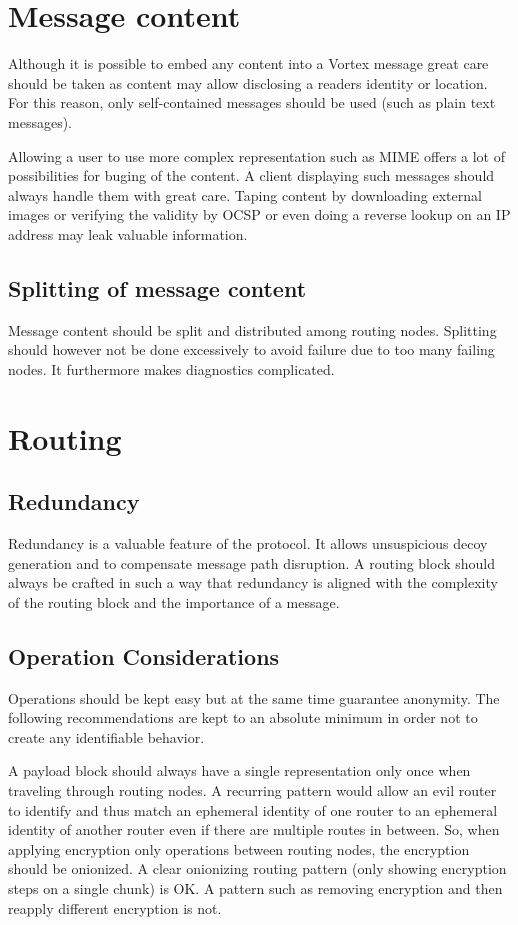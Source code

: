 \section{Message content}
Although it is possible to embed any content into a Vortex message great care should be taken as content may allow disclosing a readers identity or location. For this reason, only self-contained messages should be used (such as plain text messages).

Allowing a user to use more complex representation such as MIME offers a lot of possibilities for buging of the content. A client displaying such messages should always handle them with great care. Taping content by downloading external images or verifying the validity by OCSP or even doing a reverse lookup on an IP address may leak valuable information.

\subsection{Splitting of message content}
Message content should be split and distributed among routing nodes. Splitting should however not be done excessively to avoid failure due to too many failing nodes. It furthermore makes diagnostics complicated. 

\section{Routing}
\subsection{Redundancy}
Redundancy is a valuable feature of the protocol. It allows unsuspicious decoy generation and to compensate message path disruption. A routing block should always be crafted in such a way that redundancy is aligned with the complexity of the routing block and the importance of a message.

\subsection{Operation Considerations}
Operations should be kept easy but at the same time guarantee anonymity. The following recommendations are kept to an absolute minimum in order not to create any identifiable behavior.

A payload block should always have a single representation only once when traveling through routing nodes. A recurring pattern would allow an evil router to identify and thus match an ephemeral identity of one router to an ephemeral identity of another router even if there are multiple routes in between. So, when applying encryption only operations between routing nodes, the encryption should be onionized. A clear onionizing routing pattern (only showing encryption steps on a single chunk) is OK. A pattern such as removing encryption and then reapply different encryption is not.


